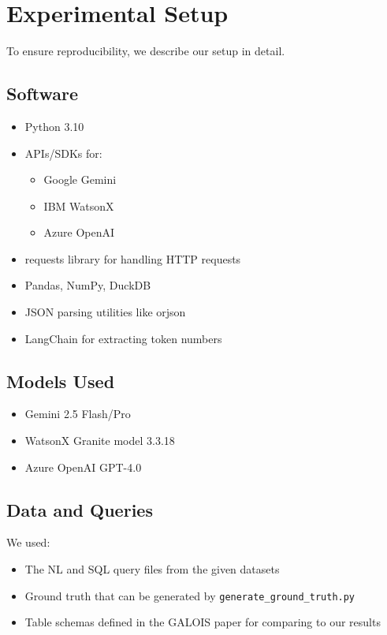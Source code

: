 \documentclass[12pt]{article}
\begin{document}
\section{Experimental Setup}

To ensure reproducibility, we describe our setup in detail.

\subsection{Software}
\begin{itemize}
    \item Python 3.10
    \item APIs/SDKs for:
    \begin{itemize}
        \item Google Gemini
        \item IBM WatsonX
        \item Azure OpenAI
    \end{itemize}
    \item requests library for handling HTTP requests
    \item Pandas, NumPy, DuckDB
    \item JSON parsing utilities like orjson
    \item LangChain for extracting token numbers 
    \end{itemize}

\subsection{Models Used}
\begin{itemize}
    \item Gemini 2.5 Flash/Pro
    \item WatsonX Granite model 3.3.18
    \item Azure OpenAI GPT-4.0
\end{itemize}

\subsection{Data and Queries}

We used:
\begin{itemize}
    \item The NL and SQL query files from the given datasets
    \item Ground truth that can be generated by \texttt{generate\_ground\_truth.py}
    \item Table schemas defined in the GALOIS paper for comparing to our results
\end{itemize}
\end{document}
